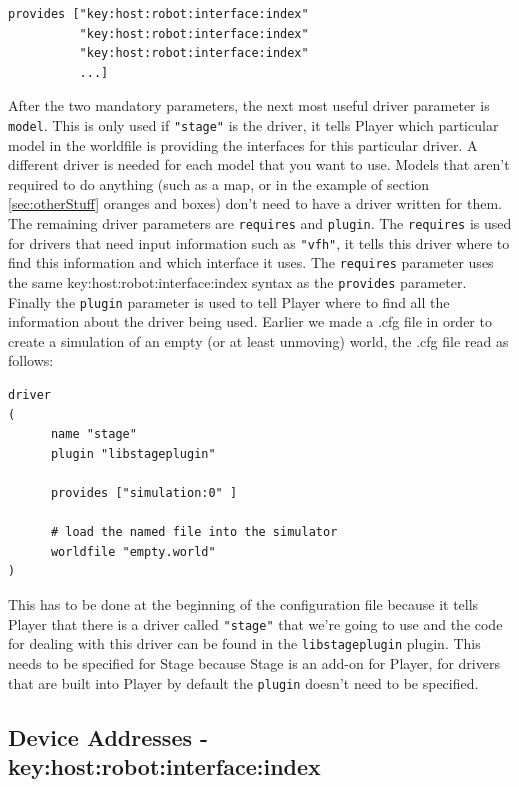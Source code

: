 \documentclass[a4paper]{report}
\newcommand{\pl}{Player\xspace}
\begin{document}
\begin{verbatim}
provides ["key:host:robot:interface:index" 
          "key:host:robot:interface:index"
          "key:host:robot:interface:index"
          ...]
\end{verbatim}

After the two mandatory parameters, the next most useful driver parameter is \verb|model|. This is only used if \verb|"stage"| is the driver, it tells \pl which particular model in the worldfile is providing the interfaces for this particular driver. A different driver is needed for each model that you want to use. Models that aren't required to do anything (such as a map, or in the example of section \ref{sec:otherStuff} oranges and boxes) don't need to have a driver written for them.\newline
The remaining driver parameters are \verb|requires| and \verb|plugin|. The \verb|requires| is used for drivers that need input information such as \verb|"vfh"|, it tells this driver where to find this information and which interface it uses. The \verb|requires| parameter uses the same key:host:robot:interface:index syntax as the \verb|provides| parameter. Finally the \verb|plugin| parameter is used to tell \pl where to find all the information about the driver being used. Earlier we made a .cfg file in order to create a simulation of an empty (or at least unmoving) world, the .cfg file read as follows:
\begin{verbatim}
driver
(		
      name "stage"
      plugin "libstageplugin"

      provides ["simulation:0" ]

      # load the named file into the simulator
      worldfile "empty.world"	
)
\end{verbatim}
This has to be done at the beginning of the configuration file because it tells \pl that there is a driver called \verb|"stage"| that we're going to use and the code for dealing with this driver can be found in the \verb|libstageplugin| plugin. This needs to be specified for Stage because Stage is an add-on for \pl, for drivers that are built into \pl by default the \verb|plugin| doesn't need to be specified.

\subsection{Device Addresses - key:host:robot:interface:index} \label{sec:deviceAddress}
\end{document}
